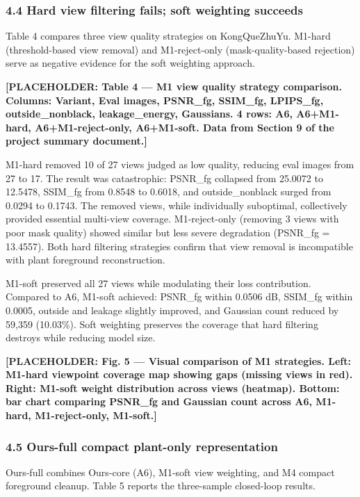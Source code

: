 \documentclass[11pt,a4paper]{article}
\begin{document}
\subsubsection{4.4 Hard view filtering fails; soft weighting
succeeds}\label{hard-view-filtering-fails-soft-weighting-succeeds}

Table 4 compares three view quality strategies on KongQueZhuYu. M1-hard
(threshold-based view removal) and M1-reject-only (mask-quality-based
rejection) serve as negative evidence for the soft weighting approach.

\textbf{{[}PLACEHOLDER: Table 4 --- M1 view quality strategy comparison.
Columns: Variant, Eval images, PSNR\_fg, SSIM\_fg, LPIPS\_fg,
outside\_nonblack, leakage\_energy, Gaussians. 4 rows: A6, A6+M1-hard,
A6+M1-reject-only, A6+M1-soft. Data from Section 9 of the project
summary document.{]}}

M1-hard removed 10 of 27 views judged as low quality, reducing eval
images from 27 to 17. The result was catastrophic: PSNR\_fg collapsed
from 25.0072 to 12.5478, SSIM\_fg from 0.8548 to 0.6018, and
outside\_nonblack surged from 0.0294 to 0.1743. The removed views, while
individually suboptimal, collectively provided essential multi-view
coverage. M1-reject-only (removing 3 views with poor mask quality)
showed similar but less severe degradation (PSNR\_fg = 13.4557). Both
hard filtering strategies confirm that view removal is incompatible with
plant foreground reconstruction.

M1-soft preserved all 27 views while modulating their loss contribution.
Compared to A6, M1-soft achieved: PSNR\_fg within 0.0506 dB, SSIM\_fg
within 0.0005, outside and leakage slightly improved, and Gaussian count
reduced by 59,359 (10.03\%). Soft weighting preserves the coverage that
hard filtering destroys while reducing model size.

\textbf{{[}PLACEHOLDER: Fig. 5 --- Visual comparison of M1 strategies.
Left: M1-hard viewpoint coverage map showing gaps (missing views in
red). Right: M1-soft weight distribution across views (heatmap). Bottom:
bar chart comparing PSNR\_fg and Gaussian count across A6, M1-hard,
M1-reject-only, M1-soft.{]}}

\subsubsection{4.5 Ours-full compact plant-only
representation}\label{ours-full-compact-plant-only-representation}

Ours-full combines Ours-core (A6), M1-soft view weighting, and M4
compact foreground cleanup. Table 5 reports the three-sample closed-loop
results.
\end{document}
